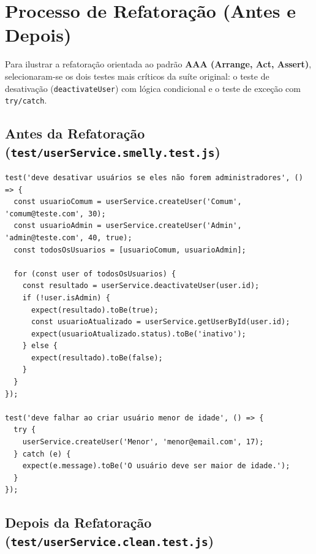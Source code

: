 \documentclass[11pt, a4paper]{article}
\begin{document}
\section{Processo de Refatoração (Antes e Depois)}

Para ilustrar a refatoração orientada ao padrão \textbf{AAA (Arrange, Act, Assert)}, selecionaram-se os dois testes mais críticos da suíte original: o teste de desativação (\texttt{deactivateUser}) com lógica condicional e o teste de exceção com \texttt{try/catch}.

\subsection{Antes da Refatoração (\texttt{test/userService.smelly.test.js})}

\begin{lstlisting}[caption={Código original com Conditional Test Logic (loop + if/else) e Try/Catch silencioso.}]
test('deve desativar usuários se eles não forem administradores', () => {
  const usuarioComum = userService.createUser('Comum', 'comum@teste.com', 30);
  const usuarioAdmin = userService.createUser('Admin', 'admin@teste.com', 40, true);
  const todosOsUsuarios = [usuarioComum, usuarioAdmin];

  for (const user of todosOsUsuarios) {
    const resultado = userService.deactivateUser(user.id);
    if (!user.isAdmin) {
      expect(resultado).toBe(true);
      const usuarioAtualizado = userService.getUserById(user.id);
      expect(usuarioAtualizado.status).toBe('inativo');
    } else {
      expect(resultado).toBe(false);
    }
  }
});

test('deve falhar ao criar usuário menor de idade', () => {
  try {
    userService.createUser('Menor', 'menor@email.com', 17);
  } catch (e) {
    expect(e.message).toBe('O usuário deve ser maior de idade.');
  }
});
\end{lstlisting}

\subsection{Depois da Refatoração (\texttt{test/userService.clean.test.js})}
\end{document}
